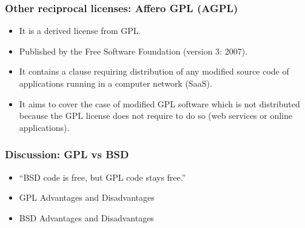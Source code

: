 
\begin{frame}
\frametitle{Other reciprocal licenses: Affero GPL (AGPL)}

\begin{itemize}
\item It is a \alert{derived} license from GPL. 
\item Published by the Free Software Foundation (version 3: 2007).
\item It contains a clause requiring distribution of any modified source code of applications \alert{running in a computer network} (SaaS).
\item It aims to cover the case of modified GPL software which is not distributed because the GPL license does not require to do so (web services or online applications). 
\end{itemize}
\end{frame}




\begin{frame}
\frametitle{Discussion: GPL vs BSD}


\begin{itemize}
\item ``BSD code is free, but GPL code stays free.'' 

\pause

\item GPL Advantages and Disadvantages

\pause

\item BSD Advantages and Disadvantages

\end{itemize}
\end{frame}





